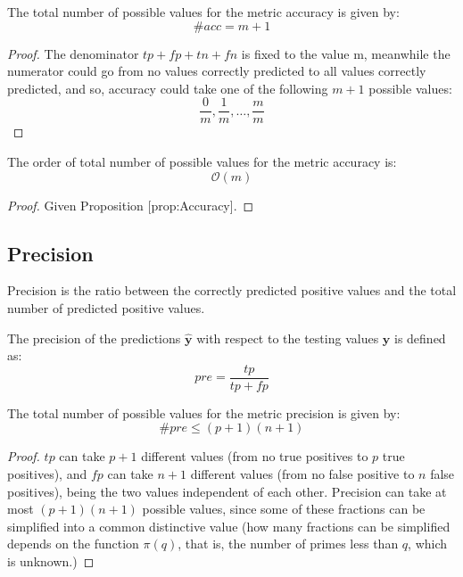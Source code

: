 \begin{proposition}
The total number of possible values for the metric accuracy is given by:
\[
\#acc = m+1
\]
\end{proposition}
\begin{proof}
The denominator $tp+fp+tn+fn$ is fixed to the value m, meanwhile the numerator could go from no values correctly predicted to all values correctly predicted, and so, accuracy could take one of the following $m+1$ possible values:
\[
\frac{0}{m},\frac{1}{m},\ldots,\frac{m}{m}
\]
\end{proof}

\begin{corollary}
The order of total number of possible values for the metric accuracy is:
\[
\mathcal{O}\left(m\right)
\]
\end{corollary}
\begin{proof}
Given Proposition [prop:Accuracy].
\end{proof}

\subsection{Precision}

Precision is the ratio between the correctly predicted positive values and the total number of predicted positive values.

\begin{definition}
The precision of the predictions $\hat{\mathbf{y}}$ with respect to the testing values $\mathbf{y}$ is defined as:
\[
pre=\frac{tp}{tp+fp}
\]
\end{definition}

\begin{proposition}
The total number of possible values for the metric precision is given by:
\[
\#pre\leq\left(p+1\right)\left(n+1\right)
\]
\end{proposition}
\begin{proof}
$tp$ can take $p+1$ different values (from no true positives to $p$ true positives), and $fp$ can take $n+1$ different values (from no false positive to $n$ false positives), being the two values independent of each other. Precision can take at most $\left(p+1\right)\left(n+1\right)$ possible values, since some of these fractions can be simplified into a common distinctive value (how many fractions can be simplified depends on the function $\pi\left(q\right)$, that is, the number of primes less than $q$, which is unknown.)
\end{proof}

